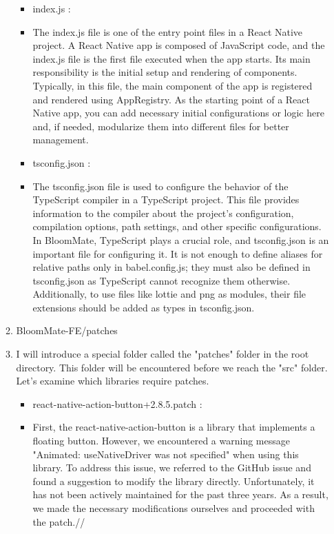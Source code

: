 \documentclass[conference, a4paper]{IEEEtran}
\begin{document}
\begin{enumerate}
\begin{enumerate}
\begin{itemize}
            \item index.js :
            \item[] The index.js file is one of the entry point files in a React Native project. A React Native app is composed of JavaScript code, and the index.js file is the first file executed when the app starts. Its main responsibility is the initial setup and rendering of components. Typically, in this file, the main component of the app is registered and rendered using AppRegistry. As the starting point of a React Native app, you can add necessary initial configurations or logic here and, if needed, modularize them into different files for better management. \\

            \item tsconfig.json : 
            \item[] The tsconfig.json file is used to configure the behavior of the TypeScript compiler in a TypeScript project. This file provides information to the compiler about the project's configuration, compilation options, path settings, and other specific configurations. In BloomMate, TypeScript plays a crucial role, and tsconfig.json is an important file for configuring it. It is not enough to define aliases for relative paths only in babel.config.js; they must also be defined in tsconfig.json as TypeScript cannot recognize them otherwise. Additionally, to use files like lottie and png as modules, their file extensions should be added as types in tsconfig.json. \\
        \end{itemize}

    \item BloomMate-FE/patches
    \item[] I will introduce a special folder called the "patches" folder in the root directory. This folder will be encountered before we reach the "src" folder. Let's examine which libraries require patches.
    \begin{itemize}
        \item react-native-action-button+2.8.5.patch : 
        \item[] First, the react-native-action-button is a library that implements a floating button. However, we encountered a warning message "Animated: useNativeDriver was not specified" when using this library. To address this issue, we referred to the GitHub issue and found a suggestion to modify the library directly. Unfortunately, it has not been actively maintained for the past three years. As a result, we made the necessary modifications ourselves and proceeded with the patch.//
        

\end{itemize}
\end{enumerate}
\end{enumerate}
\end{document}
